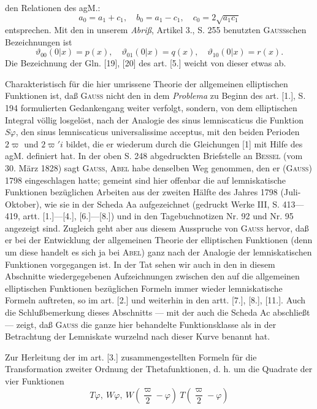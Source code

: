 \noindent den Relationen des agM.:
\[a_0=a_1+c_1,\quad b_0=a_1-c_1,\quad c_0=2\sqrt{a_1c_1}\]
\noindent entsprechen. Mit den in unserem \textit{Abriß}, Artikel 3., S. 255 benutzten \textsc{Gauss}schen Bezeichnungen ist
\[\vartheta_{00}(0|x)=p(x),\quad\vartheta_{01}(0|x)=q(x),\quad\vartheta_{10}(0|x)=r(x).\]
\noindent Die Bezeichnung der Gln. [19], [20] des art. [5.] weicht von dieser etwas ab.
\par\indent Charakteristisch für die hier umrissene Theorie der allgemeinen elliptischen Funktionen ist, daß \textsc{Gauss} nicht den in dem \textit{Problema} zu Beginn des art. [1.], S. 194 formulierten Gedankengang weiter verfolgt, sondern, von dem elliptischen Integral völlig losgelöst, nach der Analogie des sinus lemniscaticus die Funktion $S\varphi$, den sinus lemniscaticus universalissime acceptus, mit den beiden Perioden $2\varpi$ und $2\varpi'i$ bildet, die er wiederum durch die Gleichungen [1] mit Hilfe des agM. definiert hat. In der oben S. 248 abgedruckten Briefstelle an \textsc{Bessel} (vom 30. März 1828) sagt \textsc{Gauss}, \textsc{Abel} habe denselben Weg genommen, den er (\textsc{Gauss}) 1798 eingeschlagen hatte; gemeint sind hier offenbar die auf lemniskatische Funktionen bezüglichen Arbeiten aus der zweiten Hälfte des Jahres 1798 (Juli-Oktober), wie sie in der Scheda Aa aufgezeichnet (gedruckt Werke III, S. 413—419, artt. [1.]—[4.], [6.]—[8.]) und in den Tagebuchnotizen Nr. 92 und Nr. 95 angezeigt sind. Zugleich geht aber aus diesem Ausspruche von \textsc{Gauss} hervor, daß er bei der Entwicklung der allgemeinen Theorie der elliptischen Funktionen (denn um diese handelt es sich ja bei \textsc{Abel}) ganz nach der Analogie der lemniskatischen Funktionen vorgegangen ist. In der Tat sehen wir auch in den in diesem Abschnitte wiedergegebenen Aufzeichnungen zwischen den auf die allgemeinen elliptischen Funktionen bezüglichen Formeln immer wieder lemniskatische Formeln auftreten, so im art. [2.] und weiterhin in den artt. [7.], [8.], [11.]. Auch die Schlußbemerkung dieses Abschnitts — mit der auch die Scheda Ac abschließt — zeigt, daß \textsc{Gauss} die ganze hier behandelte Funktionsklasse als in der Betrachtung der Lemniskate wurzelnd nach dieser Kurve benannt hat.
\par\indent Zur Herleitung der im art. [3.] zusammengestellten Formeln für die Transformation zweiter Ordnung der Thetafunktionen, d. h. um die Quadrate der vier Funktionen
\[T\varphi,\ W\varphi,\ W\left(\frac\varpi2-\varphi\right)\ T\left(\frac\varpi2-\varphi\right)\]
\clearpage
\fancyhead{}
